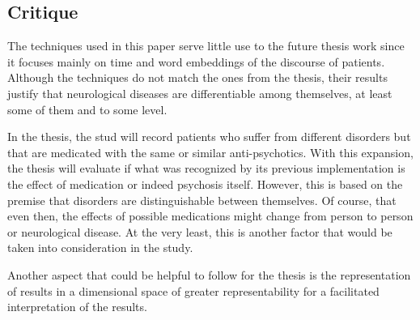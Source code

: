 \documentclass{Paper_Summary}
\begin{document}
\makepapertitle

\breakline

\begin{center}
    \section*{Critique}
\end{center}

    The techniques used in this paper serve little use to the future thesis work since it focuses mainly on time and word embeddings of the discourse of patients. Although the techniques do not match the ones from the thesis, their results justify that neurological diseases are differentiable among themselves, at least some of them and to some level.

    In the thesis, the stud will record patients who suffer from different disorders but that are medicated with the same or similar anti-psychotics.
    With this expansion, the thesis will evaluate if what was recognized by its previous implementation is the effect of medication or indeed psychosis itself. However, this is based on the premise that disorders are distinguishable between themselves. Of course, that even then, the effects of possible medications might change from person to person or neurological disease. At the very least, this is another factor that would be taken into consideration in the study.

    Another aspect that could be helpful to follow for the thesis is the representation of results in a dimensional space of greater representability for a facilitated interpretation of the results. 

\breakline
\end{document}
